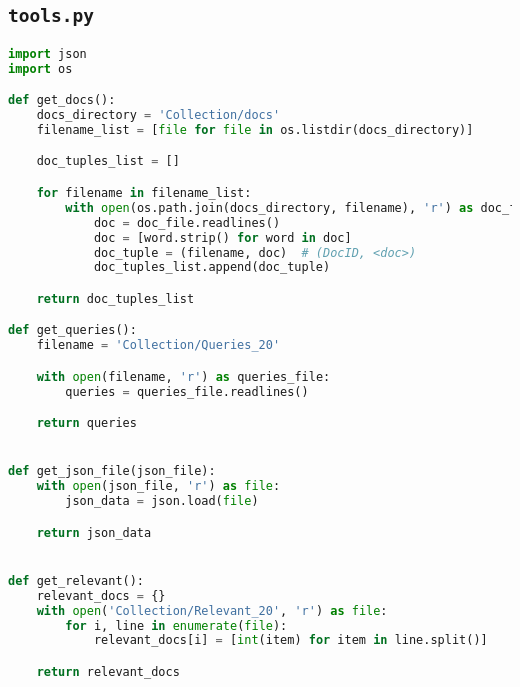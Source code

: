 ﻿\subsection{\texttt{tools.py}}
\begin{lstlisting}[language=Python]
import json
import os

def get_docs():
    docs_directory = 'Collection/docs'
    filename_list = [file for file in os.listdir(docs_directory)]

    doc_tuples_list = []

    for filename in filename_list:
        with open(os.path.join(docs_directory, filename), 'r') as doc_file:
            doc = doc_file.readlines()
            doc = [word.strip() for word in doc]
            doc_tuple = (filename, doc)  # (DocID, <doc>)
            doc_tuples_list.append(doc_tuple)

    return doc_tuples_list

def get_queries():
    filename = 'Collection/Queries_20'

    with open(filename, 'r') as queries_file:
        queries = queries_file.readlines()

    return queries


def get_json_file(json_file):
    with open(json_file, 'r') as file:
        json_data = json.load(file)

    return json_data


def get_relevant():
    relevant_docs = {}
    with open('Collection/Relevant_20', 'r') as file:
        for i, line in enumerate(file):
            relevant_docs[i] = [int(item) for item in line.split()]

    return relevant_docs
\end{lstlisting}


